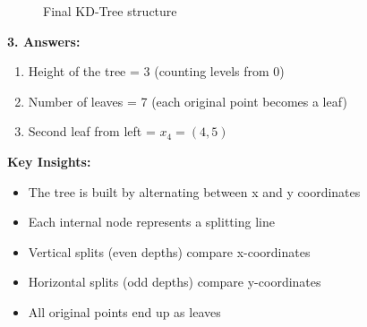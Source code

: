 \begin{figure}[H]
    \centering
    \caption*{Final KD-Tree structure}
\end{figure}

\textbf{3. Answers:}
\begin{enumerate}[noitemsep]
    \item Height of the tree = 3 (counting levels from 0)
    \item Number of leaves = 7 (each original point becomes a leaf)
    \item Second leaf from left = $x_4 = (4,5)$
\end{enumerate}

\textbf{Key Insights:}
\begin{itemize}[noitemsep]
    \item The tree is built by alternating between x and y coordinates
    \item Each internal node represents a splitting line
    \item Vertical splits (even depths) compare x-coordinates
    \item Horizontal splits (odd depths) compare y-coordinates
    \item All original points end up as leaves
\end{itemize}
